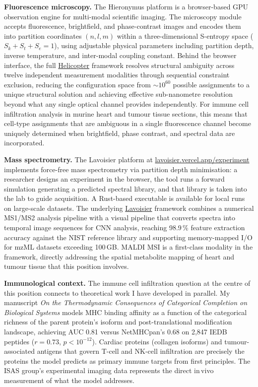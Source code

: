 \documentclass[12pt,a4paper]{article}
\begin{document}
\textbf{Fluorescence microscopy.}
The Hieronymus platform is a browser-based GPU observation engine for multi-modal
scientific imaging. The microscopy module accepts fluorescence, brightfield, and
phase-contrast images and encodes them into partition coordinates $(n, l, m)$
within a three-dimensional S-entropy space ($S_k + S_t + S_e = 1$), using
adjustable physical parameters including partition depth, inverse temperature, and
inter-modal coupling constant. Behind the browser interface, the full
\href{https://github.com/fullscreen-triangle/helicopter}{Helicopter} framework
resolves structural ambiguity across twelve independent measurement modalities
through sequential constraint exclusion, reducing the configuration space from
${\sim}10^{60}$ possible assignments to a unique structural solution and achieving
effective sub-nanometre resolution beyond what any single optical channel provides
independently. For immune cell infiltration analysis in murine heart and tumour
tissue sections, this means that cell-type assignments that are ambiguous in a
single fluorescence channel become uniquely determined when brightfield, phase
contrast, and spectral data are incorporated.

\textbf{Mass spectrometry.}
The Lavoisier platform at
\href{https://lavoisier.vercel.app/experiment}{lavoisier.vercel.app/experiment}
implements force-free mass spectrometry via partition depth minimisation: a
researcher designs an experiment in the browser, the tool runs a forward simulation
generating a predicted spectral library, and that library is taken into the lab to
guide acquisition. A Rust-based executable is available for local runs on
large-scale datasets. The underlying
\href{https://github.com/fullscreen-triangle/lavoisier}{Lavoisier} framework
combines a numerical MS1/MS2 analysis pipeline with a visual pipeline that
converts spectra into temporal image sequences for CNN analysis, reaching
98.9\,\% feature extraction accuracy against the NIST reference library and
supporting memory-mapped I/O for mzML datasets exceeding 100\,GB.
MALDI MSI is a first-class modality in the framework, directly addressing the
spatial metabolite mapping of heart and tumour tissue that this position involves.

\textbf{Immunological context.}
The immune cell infiltration question at the centre of this position connects
to theoretical work I have developed in parallel.
My manuscript \textit{On the Thermodynamic Consequences of Categorical Completion
on Biological Systems} models MHC binding affinity as a function of the
categorical richness of the parent protein's isoform and post-translational
modification landscape, achieving AUC 0.81 versus NetMHCpan's 0.68 on
2,847 IEDB peptides ($r = 0.73$, $p < 10^{-12}$).
Cardiac proteins (collagen isoforms) and tumour-associated antigens that govern
T-cell and NK-cell infiltration are precisely the proteins the model predicts
as primary immune targets from first principles.
The ISAS group's experimental imaging data represents the direct in\,vivo
measurement of what the model addresses.
\end{document}
